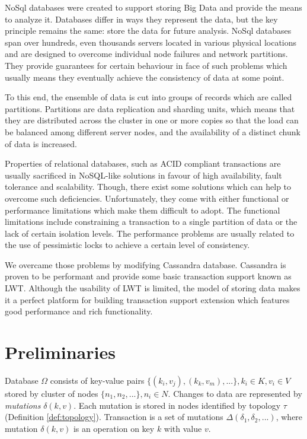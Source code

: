 \documentclass[runningheads,a4paper]{llncs}
\newcommand{\mutation}[2]{$\delta(#1, #2)$\xspace}
\begin{document}
NoSql databases were created to support storing Big Data and provide the means
to analyze it.  Databases differ in ways they represent the data, but the key
principle remains the same:  store the data for future analysis. NoSql databases
span over hundreds, even thousands servers  located in various physical
locations and are designed to overcome individual node  failures and network
partitions. They provide guarantees for certain behaviour in face of such
problems which usually means they eventually achieve the consistency of data at
some point.

To this end, the ensemble of data is cut into groups of records which are called
partitions.  Partitions are data replication and sharding units, which means
that they are distributed across  the cluster in one or more copies so that the
load can be balanced among different server nodes, and the availability of a
distinct chunk of data is increased.

Properties of relational databases, such as ACID compliant transactions are
usually sacrificed in NoSQL-like solutions in favour of high availability, fault
tolerance and scalability. Though,  there exist some solutions which can help to
overcome such deficiencies. Unfortunately, they come with either functional or
performance limitations which make them difficult to adopt.  The functional
limitations include constraining a transaction to a single partition of data or
the lack of certain isolation levels. The performance problems are usually
related to the use of pessimistic locks to achieve a certain level of
consistency.

We overcame those problems by modifying Cassandra database. Cassandra is proven
to be performant  and provide some basic transaction support known as LWT.
Although the usability of LWT is limited, the model of storing data makes it a
perfect platform for building transaction support extension which features good
performance and rich functionality.

\section{Preliminaries}

Database $\Omega$ consists of key-value pairs $\{(k_{i},v_{j}), (k_{k},v_{m}),...\}, k_i\in\mathit{K}, v_i\in\mathit{V}$ stored by cluster of nodes $\{n_1, n_2, ...\}, n_i\in\mathit{N}$.
Changes to data are represented by \emph{mutations} $\delta(k,v)$. 
Each mutation is stored in nodes identified by topology $\tau$ (Definition \ref{def:topology}).
Transaction is a set of mutations $\Delta(\delta_{1}, \delta_{2}, ...)$, where mutation \mutation{k}{v} is an operation
on key $k$ with value $v$.
\end{document}
